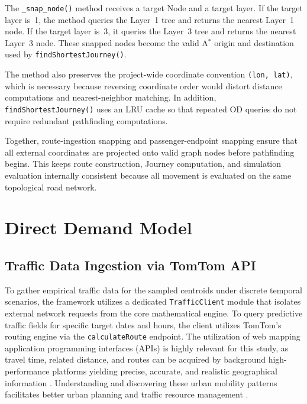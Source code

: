 {The \texttt{\_snap\_node()} method receives a target Node and a target layer. If the target layer is~1, the method queries the Layer~1 tree and returns the nearest Layer~1 node. If the target layer is~3, it queries the Layer~3 tree and returns the nearest Layer~3 node. These snapped nodes become the valid A$^\ast$ origin and destination used by \texttt{findShortestJourney()}.

The method also preserves the project-wide coordinate convention \texttt{(lon, lat)}, which is necessary because reversing coordinate order would distort distance computations and nearest-neighbor matching. In addition, \texttt{findShortestJourney()} uses an LRU cache so that repeated \ac{OD} queries do not require redundant pathfinding computations.

Together, route-ingestion snapping and passenger-endpoint snapping ensure that all external coordinates are projected onto valid graph nodes before pathfinding begins. This keeps route construction, Journey computation, and simulation evaluation internally consistent because all movement is evaluated on the same topological road network.

\section{Direct Demand Model}
\label{sec:3.3 ddm}

\subsection{Traffic Data Ingestion via TomTom API}
\noindent To gather empirical traffic data for the sampled centroids under discrete temporal scenarios, the framework utilizes a dedicated \texttt{TrafficClient} module that isolates external network requests from the core mathematical engine. To query predictive traffic fields for specific target dates and hours, the client utilizes TomTom’s routing engine via the \texttt{calculateRoute} endpoint. The utilization of web mapping application programming interfaces (APIs) is highly relevant for this study, as travel time, related distance, and routes can be acquired by background high-performance platforms yielding precise, accurate, and realistic geographical information \citep{munoz2021study}. Understanding and discovering these urban mobility patterns facilitates better urban planning and traffic resource management \citep{munoz2021study}.

}
